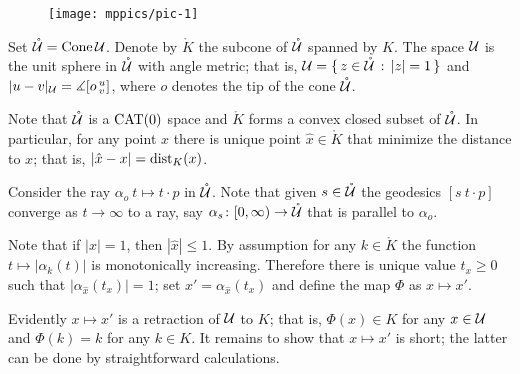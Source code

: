 \documentclass[oneside,a4paper, 12pt]{article}
\begin{document}
\begin{wrapfigure}{o}{55 mm}
\centering
\texttt{[image: mppics/pic-1]}
\end{wrapfigure}

Set $\mathring{\mathcal{U}}=\mathop{\rm Cone}\nolimits \mathcal{U}$.
Denote by $\mathring{K}$ the subcone of $\mathring{\mathcal{U}}$ spanned by $K$.
The space $\mathcal{U}$ is the unit sphere in $\mathring{\mathcal{U}}$ with angle metric;
that is, $\mathcal{U}=\{\,{z\in \mathring{\mathcal{U}}}\,:\,{|z|=1}\,\}$ and $|u-v|_{\mathcal{U}}=\measuredangle[o\,{}^u_v]$, where $o$ denotes the tip of the cone $\mathring{\mathcal{U}}$.

Note that $\mathring{\mathcal{U}}$ is a $\mathrm{CAT}(0)$ space and $\mathring{K}$ forms a convex closed subset of $\mathring{\mathcal{U}}$.
In particular, for any point $x$ there is unique point $\hat x\in \mathring{K}$
that minimize the distance to $x$;
that is, $|\hat x-x|=\mathop{\rm dist}\nolimits_K(x)$.

Consider the ray $\alpha_o\:t\mapsto t\cdot p$ in  $\mathring{\mathcal{U}}$.
Note that given $s\in \mathring{\mathcal{U}}$
the geodesics $[s\ t\cdot p]$ converge as $t\to\infty$ to a ray, 
say $\alpha_s\colon[0,\infty)\to \mathring{\mathcal{U}}$ that is parallel to $\alpha_o$.

Note that if $|x|=1$, then $|\hat x|\le 1$.
By assumption for any $k\in \mathring{K}$ the function $t\mapsto |\alpha_k(t)|$ is monotonically increasing.
Therefore there is unique value $t_x\ge 0$ such that
$|\alpha_{\hat x}(t_x)|=1$;
set $x'=\alpha_{\hat x}(t_x)$ and define the map $\Phi$ as $x\mapsto x'$.

Evidently $x\mapsto x'$ is a retraction of $\mathcal{U}$ to $K$;
that is,
$\Phi(x)\in K$ for any $x\in \mathcal{U}$
and 
$\Phi(k)=k$ for any $k\in K$.
It remains to show that $x\mapsto x'$ is short; 
the latter can be done by straightforward calculations.
\qeds

{\small\sloppy

\printbibliography[heading=bibintoc]

}
\end{document}
